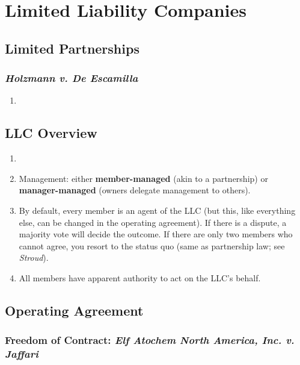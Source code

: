 \section{Limited Liability Companies}

\subsection{Limited Partnerships}

\subsubsection{\emph{Holzmann v. De Escamilla}}

\begin{enumerate}
    \item %
\end{enumerate}

\subsection{LLC Overview}

\begin{enumerate}
    \item %
    \item Management: either \textbf{member-managed} (akin to a partnership) 
    or \textbf{manager-managed} (owners delegate management to others). %
    \item By default, every member is an agent of the LLC (but this, like 
    everything else, can be changed in the operating agreement). If there is a 
    dispute, a majority vote will decide the outcome. If there are only two 
    members who cannot agree, you resort to the status quo (same as 
    partnership law; see \emph{Stroud}).
    \item All members have apparent authority to act on the LLC's behalf.
\end{enumerate}

\subsection{Operating Agreement}

\subsubsection{Freedom of Contract: \emph{Elf Atochem North America, Inc. v. 
Jaffari}}


